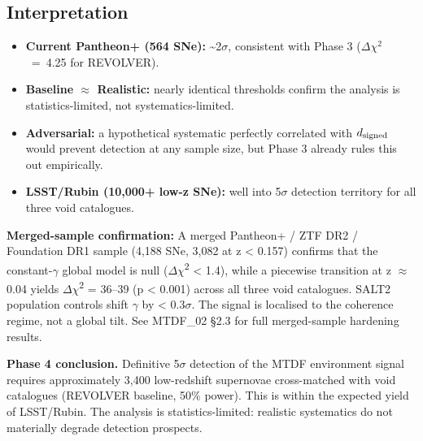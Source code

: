 \documentclass[11pt,a4paper]{article}
\begin{document}
\subsection{Interpretation}
\begin{itemize}
  \item \textbf{Current Pantheon+ (564 SNe):} \~{}2$\sigma$, consistent with Phase 3 ($\Delta$$\chi$$^{2}$~=~4.25 for REVOLVER).
  \item \textbf{Baseline $\approx$ Realistic:} nearly identical thresholds confirm the analysis is statistics-limited, not systematics-limited.
  \item \textbf{Adversarial:} a hypothetical systematic perfectly correlated with \( d_{\rm signed} \) would prevent detection at any sample size, but Phase 3 already rules this out empirically.
  \item \textbf{LSST/\allowbreak{}Rubin (10,000+ low-z SNe):} well into 5$\sigma$ detection territory for all three void catalogues.
\end{itemize}

\begin{mdframed}[linecolor=accent,linewidth=0.5pt,backgroundcolor=callout-bg,leftline=true,rightline=true,topline=true,bottomline=true,innerleftmargin=8pt,innerrightmargin=8pt,innertopmargin=6pt,innerbottommargin=6pt]
\textbf{Merged-sample confirmation:} A merged Pantheon+ / ZTF DR2 / Foundation DR1 sample (4,188 SNe, 3,082 at z < 0.157) confirms that the constant-$\gamma$ global model is null ($\Delta$$\chi$\textsuperscript{2} < 1.4), while a piecewise transition at z $\approx$ 0.04 yields $\Delta$$\chi$\textsuperscript{2} = 36--39 (p < 0.001) across all three void catalogues. SALT2 population controls shift $\gamma$ by < 0.3$\sigma$. The signal is localised to the coherence regime, not a global tilt. See MTDF\_\allowbreak{}02 \S{}2.3 for full merged-sample hardening results.
\end{mdframed}

\begin{mdframed}[linecolor=accent,linewidth=0.5pt,backgroundcolor=callout-bg,leftline=true,rightline=true,topline=true,bottomline=true,innerleftmargin=8pt,innerrightmargin=8pt,innertopmargin=6pt,innerbottommargin=6pt]
\textbf{Phase 4 conclusion.}
Definitive 5$\sigma$ detection of the MTDF environment signal requires approximately 3,400 low-redshift supernovae cross-matched with void catalogues (REVOLVER baseline, 50\% power). This is within the expected yield of LSST/\allowbreak{}Rubin. The analysis is statistics-limited: realistic systematics do not materially degrade detection prospects.
\end{mdframed}
\end{document}
